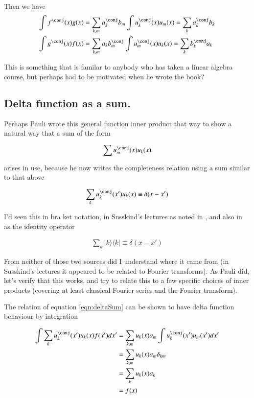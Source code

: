 \documentclass{article}
\newcommand{\ket}[1]{\lvert {#1} \rangle}
\newcommand{\bra}[1]{\langle {#1} \rvert}
\newcommand{\ketbra}[2]{\ket{#1}\bra{#2}}
\begin{document}
Then we have 
\begin{align*}
\int f^\conj(x) g(x) &= \sum_{k,m} a_k^\conj b_m \int u_k^\conj(x) u_m(x) = \sum_k a_k^\conj b_k \\
\int g^\conj(x) f(x) &= \sum_{k,m} a_k b_m^\conj \int u_m^\conj(x) u_k(x) = \sum_k b_k^\conj a_k \\
\end{align*}

This is something that is familar to anybody who has taken a linear
algebra course, but perhaps had to be motivated when he wrote the book?

\subsection{ Delta function as a sum. }

Perhaps Pauli wrote this general function inner product that way to show a natural way that a sum of the
form

\begin{align*}
\sum u_m^\conj(x) u_k(x)
\end{align*}

arises in use, because he now writes the completeness relation using a sum similar to that above

\begin{align}\label{eqn:deltaSum}
\sum_{k} u_k^\conj(x') u_k(x) \equiv \delta(x-x') 
\end{align}

I'd seen this in bra ket notation, in Susskind's lectures as noted in \cite{PJQmSusskind}, and also in \cite{mcmahon2005qmd} as the
identity operator

\begin{align}
\sum_{k} \ketbra{k}{k} \equiv \delta(x-x') 
\end{align}

From neither of those two sources did I understand where it came from (in Susskind's lectures it appeared to be
related to Fourier transforms).
As Pauli did, let's verify that this works, and try to relate this to a few specific choices of inner products (covering at
least classical Fourier series and the Fourier transform).

The relation of equation \ref{eqn:deltaSum} can be shown to have delta function behaviour by integration

\begin{align*}
\int \sum_{k} u_k^\conj(x') u_k(x) f(x') dx'
&=
\sum_{k,m} u_k(x) a_m \int u_k^\conj(x') u_m(x') dx' \\
&=
\sum_{k,m} u_k(x) a_m \delta_{km} \\
&=
\sum_{k} u_k(x) a_k \\
&=
f(x) 
\end{align*}
\end{document}
